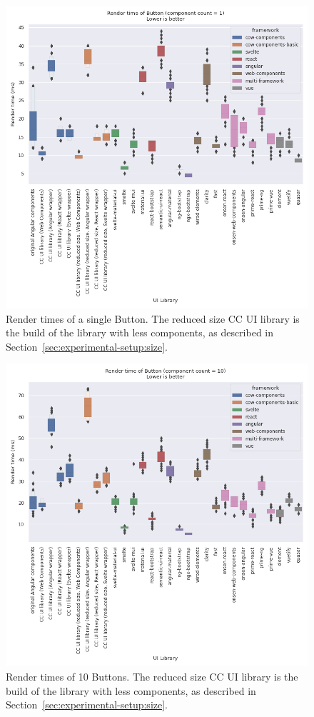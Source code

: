 \begin{figure}[h]
	\includegraphics[width=\columnwidth]{plots/render-time-all-1-Button.png}
	\caption{Render times of a single Button. The reduced size CC UI library is the build of the library with less components, as described in Section~\ref{sec:experimental-setup:size}.}
	\label{fig:results:render-time-all-1}
	\centering
\end{figure}

\begin{figure}[h]
	\includegraphics[width=\columnwidth]{plots/render-time-all-10-Button.png}
	\caption{Render times of 10 Buttons. The reduced size CC UI library is the build of the library with less components, as described in Section~\ref{sec:experimental-setup:size}.}
	\label{fig:results:render-time-all-10}
	\centering
\end{figure}

